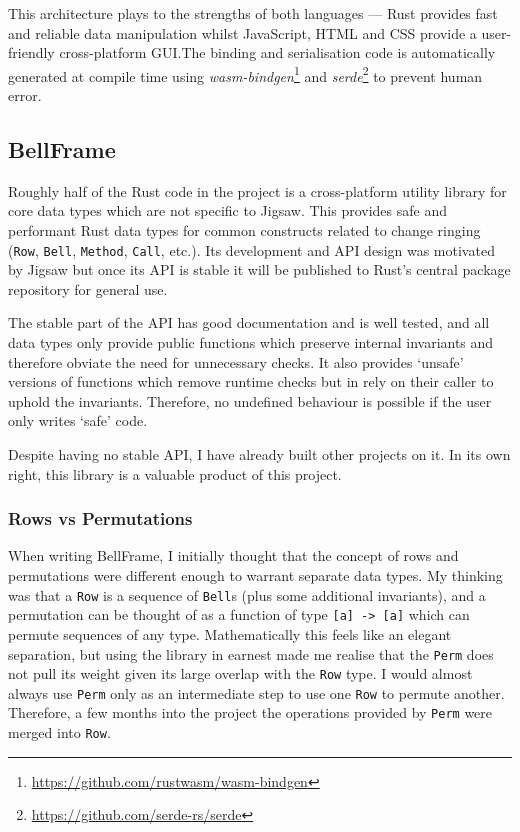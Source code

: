 \documentclass[12pt]{article}
\newcommand{\footurl}[1]{\footnote{\url{#1}}}
\begin{document}
This architecture plays to the strengths of both languages --- Rust provides fast and reliable data
manipulation whilst JavaScript, HTML and CSS provide a user-friendly cross-platform GUI.\@  The
binding and serialisation code is automatically generated at compile time using
\emph{wasm-bindgen}\footurl{https://github.com/rustwasm/wasm-bindgen} and
\emph{serde}\footurl{https://github.com/serde-rs/serde} to prevent human error.

\subsection{BellFrame}

Roughly half of the Rust code in the project is a cross-platform utility library for core data types
which are not specific to Jigsaw.  This provides safe and performant Rust data types for common
constructs related to change ringing (\verb|Row|, \verb|Bell|, \verb|Method|, \verb|Call|, etc.).
Its development and API design was motivated by Jigsaw but once its API is stable it will be
published to Rust's central package repository for general use.

The stable part of the API has good documentation and is well tested, and all data types only
provide public functions which preserve internal invariants and therefore obviate the need for
unnecessary checks.  It also provides `unsafe' versions of functions which remove runtime checks but
in rely on their caller to uphold the invariants.  Therefore, no undefined behaviour is possible if
the user only writes `safe' code.

Despite having no stable API, I have already built other projects on it.  In its own right, this
library is a valuable product of this project.

\subsubsection{Rows vs Permutations}

When writing BellFrame, I initially thought that the concept of rows and permutations were different
enough to warrant separate data types.  My thinking was that a \verb|Row| is a sequence of
\verb|Bell|s (plus some additional invariants), and a permutation can be thought of as a function of
type \verb|[a] -> [a]| which can permute sequences of any type.  Mathematically this feels like an
elegant separation, but using the library in earnest made me realise that the \verb|Perm| does not
pull its weight given its large overlap with the \verb|Row| type.  I would almost always use
\verb|Perm| only as an intermediate step to use one \verb|Row| to permute another.  Therefore, a few
months into the project the operations provided by \verb|Perm| were merged into \verb|Row|.
\end{document}
